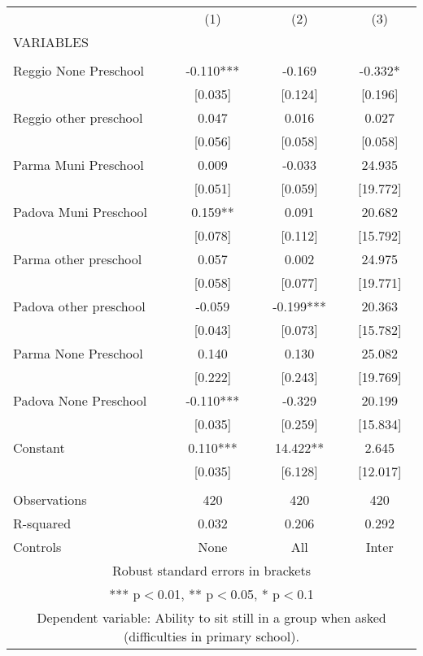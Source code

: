 \begin{tabular}{lccc} \hline
 & (1) & (2) & (3) \\
VARIABLES &  &  &  \\ \hline
 &  &  &  \\
Reggio None Preschool & -0.110*** & -0.169 & -0.332* \\
 & [0.035] & [0.124] & [0.196] \\
Reggio other preschool & 0.047 & 0.016 & 0.027 \\
 & [0.056] & [0.058] & [0.058] \\
Parma Muni Preschool & 0.009 & -0.033 & 24.935 \\
 & [0.051] & [0.059] & [19.772] \\
Padova Muni Preschool & 0.159** & 0.091 & 20.682 \\
 & [0.078] & [0.112] & [15.792] \\
Parma other preschool & 0.057 & 0.002 & 24.975 \\
 & [0.058] & [0.077] & [19.771] \\
Padova other preschool & -0.059 & -0.199*** & 20.363 \\
 & [0.043] & [0.073] & [15.782] \\
Parma None Preschool & 0.140 & 0.130 & 25.082 \\
 & [0.222] & [0.243] & [19.769] \\
Padova None Preschool & -0.110*** & -0.329 & 20.199 \\
 & [0.035] & [0.259] & [15.834] \\
Constant & 0.110*** & 14.422** & 2.645 \\
 & [0.035] & [6.128] & [12.017] \\
 &  &  &  \\
Observations & 420 & 420 & 420 \\
R-squared & 0.032 & 0.206 & 0.292 \\
 Controls & None & All & Inter \\ \hline
\multicolumn{4}{c}{ Robust standard errors in brackets} \\
\multicolumn{4}{c}{ *** p$<$0.01, ** p$<$0.05, * p$<$0.1} \\
\multicolumn{4}{c}{ Dependent variable: Ability to sit still in a group when asked (difficulties in primary school).} \\
\end{tabular}
